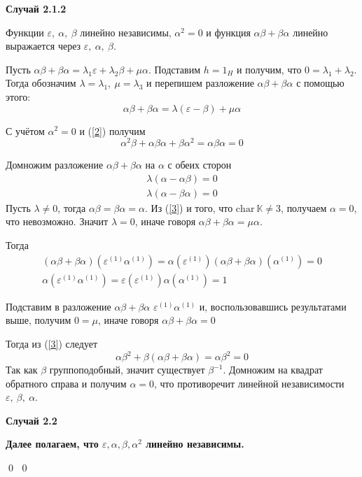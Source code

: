 \documentclass[12pt, reqno, a4paper, oneside, notitlepage]{amsart}
\makeatletter
\theoremstyle{mytheoremstyle}
\theoremstyle{myremarkstyle}
\numberwithin{equation}{section}
\renewenvironment{proof}[1][\proofname]{\par\indent {\bfseries #1\@addpunct{.} }}{\qed}
\makeatother
\begin{document}
\begin{proof}
\begin{proof}
    \textbf{Случай 2.1.2}

    Функции $\varepsilon,\ \alpha,\ \beta$ линейно независимы, $\alpha^2 =0$ и функция $\alpha\beta+\beta\alpha$ линейно выражается через $\varepsilon,\ \alpha,\ \beta$.

    Пусть $\alpha\beta + \beta\alpha = \lambda_1\varepsilon+\lambda_2\beta + \mu\alpha$. Подставим $h = 1_H$ и получим, что $0 = \lambda_1 + \lambda_2$. Тогда обозначим $\lambda = \lambda_1,\ \mu = \lambda_3$ и перепишем разложение $\alpha\beta+\beta\alpha$ с помощью этого: \[
    \alpha\beta+\beta\alpha = \lambda(\varepsilon-\beta) + \mu\alpha
    \]
    
    С учётом $\alpha^2=0$ и (\ref{2}) получим \[
    \alpha^2\beta+\alpha\beta\alpha+\beta\alpha^2 = \alpha\beta\alpha = 0
    \]

    Домножим разложение $\alpha\beta+\beta\alpha$ на $\alpha$ с обеих сторон 
    \begin{eqnarray*}
        \lambda(\alpha-\alpha\beta) = 0\\
        \lambda(\alpha-\beta\alpha) = 0
    \end{eqnarray*}
    Пусть $\lambda \neq 0$, тогда $\alpha\beta=\beta\alpha = \alpha$. Из (\ref{3}) и того, что $\mathrm{char}\ \mathbb{K} \neq 3$, получаем $\alpha = 0$, что невозможно.
    Значит $\lambda = 0$, иначе говоря $\alpha\beta+\beta\alpha = \mu\alpha$.

    Тогда 
    \begin{eqnarray*}
    (\alpha\beta+\beta\alpha)(\varepsilon^{(1)}\alpha^{(1)}) = \alpha(\varepsilon^{(1)})(\alpha\beta+\beta\alpha)(\alpha^{(1)}) = 0\\
    \alpha(\varepsilon^{(1)}\alpha^{(1)}) = \varepsilon(\varepsilon^{(1)})\alpha(\alpha^{(1)}) = 1
    \end{eqnarray*}

    Подставим в разложение $\alpha\beta+\beta\alpha$ $\varepsilon^{(1)}\alpha^{(1)}$ и, воспользовавшись результатами выше, получим $0 = \mu$, иначе говоря $\alpha\beta+\beta\alpha = 0$

    Тогда из (\ref{3}) следует \[
    \alpha\beta^2+\beta(\alpha\beta+\beta\alpha) = \alpha\beta^2=0
    \]
    Так как $\beta$ группоподобный, значит существует $\beta^{-1}$. Домножим на квадрат обратного справа и получим  $\alpha = 0$, что противоречит линейной независимости $\varepsilon,\ \beta,\ \alpha$.
    
    \textbf{Случай 2.2}

    \textbf{Далее полагаем, что $\varepsilon, \alpha, \beta, \alpha^2$ линейно независимы.}


\end{proof}
\end{proof}
\end{document}
